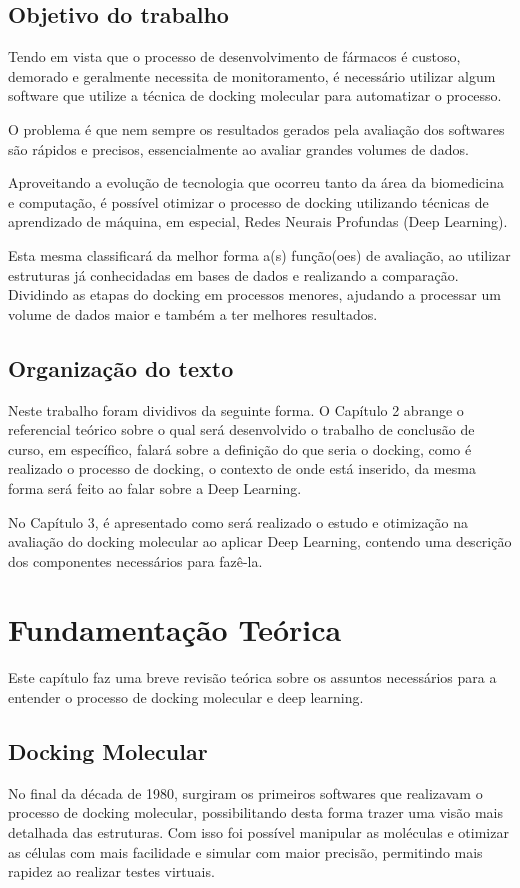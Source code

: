 \documentclass[tcc, capa]{texucpel}
\begin{document}
\section{Objetivo do trabalho}
Tendo em vista que o processo de desenvolvimento de fármacos é custoso, demorado e geralmente necessita de monitoramento, é necessário utilizar algum software que utilize a técnica de docking molecular para automatizar o processo.

O problema é que nem sempre os resultados gerados pela avaliação dos softwares são rápidos e precisos, essencialmente ao avaliar grandes volumes de dados.

Aproveitando a evolução de tecnologia que ocorreu tanto da área da biomedicina e computação, é possível otimizar o processo de docking utilizando técnicas de aprendizado de máquina, em especial, Redes Neurais Profundas (Deep Learning).

Esta mesma classificará da melhor forma a(s) função(oes) de avaliação, ao utilizar estruturas já conhecidadas em bases de dados e realizando a comparação.
Dividindo as etapas do docking em processos menores, ajudando a processar um volume de dados maior e também a ter melhores resultados.


\section{Organização do texto}
Neste trabalho foram dividivos da seguinte forma.
O Capítulo 2 abrange o referencial teórico sobre o qual será desenvolvido o trabalho de conclusão de curso, em específico, falará sobre a definição do que seria o docking, como é realizado o processo de docking, o contexto de onde está inserido, da mesma forma será feito ao falar sobre a Deep Learning.

No Capítulo 3, é apresentado como será realizado o estudo e otimização na avaliação do docking molecular ao aplicar Deep Learning, contendo uma descrição dos componentes necessários para fazê-la.

\chapter{Fundamentação Teórica}
Este capítulo faz uma breve revisão teórica sobre os assuntos necessários para a entender o processo de docking molecular  e deep learning.

\section{Docking Molecular}
No final da década de 1980, surgiram os primeiros softwares que realizavam o processo de docking molecular, possibilitando desta forma trazer uma visão mais detalhada das estruturas. Com isso foi possível manipular as moléculas e otimizar as células com mais facilidade e simular com maior precisão, permitindo mais rapidez ao realizar testes virtuais.
\end{document}
